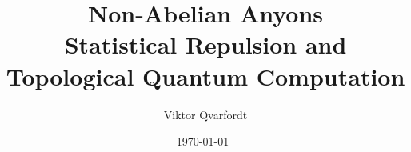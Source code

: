




\title{{\huge Non-Abelian Anyons}\\[0.5em]Statistical Repulsion and\\Topological Quantum Computation}
\author{Viktor Qvarfordt}
\date{\isodate\today\ \currenttime}

\maketitle



\tableofcontents
\newpage










\appendix


\backmatter



